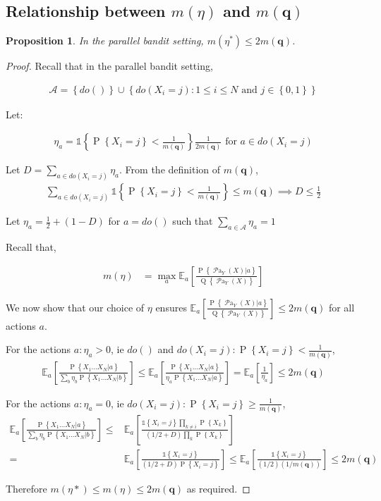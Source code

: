 \documentclass{article}
\newcommand{\set}[1]{\left\{#1\right\}}
\newcommand{\ind}[1]{\mathds{1}\!\!\set{#1}}
\newcommand{\eq}[1]{\begin{align*}#1\end{align*}}
\renewcommand{\P}[1]{\operatorname{P}\left\{#1\right\}}
\newcommand{\Q}[1]{\operatorname{Q}\left\{#1\right\}}
\newcommand{\EE}{\mathbb E}
\newcommand{\EEa}{\EE_a}
\newcommand{\Pn}[2]{\operatorname{P}\left\{#2|#1\right\}}
\newcommand{\parents}[1]{\operatorname{\mathcal{P}a}_{#1}}
\newcommand{\calA}{\mathcal A}
\theoremstyle{plain}
\newtheorem{proposition}[theorem]{Proposition}
\theoremstyle{definition}
\begin{document}
\subsection{Relationship between $m(\eta)$ and $m(\boldsymbol{q})$}\label{sec:m-equivelence}

\begin{proposition} In the parallel bandit setting,
$m(\eta^*) \leq 2m(\boldsymbol{q})$.
\end{proposition} 

\begin{proof}

Recall that in the parallel bandit setting,

\eq{
\mathcal{A} = \set{do()} \cup \set{ do(X_i = j) \colon 1 \leq i \leq N \text{ and } j \in \set{0,1}}
}

Let:

\eq {
\eta_a = \ind{\P{X_i = j} < \frac{1}{m(\boldsymbol{q})}}\frac{1}{2m(\boldsymbol{q})} \text { for } a \in do(X_i = j)
}

Let $D =\sum_{a\in do(X_i=j)}\eta_a$. From the definition of $m(\boldsymbol{q})$, 
\eq {
\sum_{a\in do(X_i=j)} \ind{\P{X_i = j} < \frac{1}{m(\boldsymbol{q})}} \leq m(\boldsymbol{q}) \implies D \leq \frac{1}{2}
}
 
Let $\eta_a = \frac{1}{2} + (1-D)$ for $a = do()$ such that $\sum_{a \in \calA}\eta_a = 1$ 

Recall that,

\eq{
m(\eta) &
= \max_a \EEa\left[\frac{\Pn{a}{\parents{Y}(X)}}{\Q{\parents{Y}(X)}}\right]
}

We now show that our choice of $\eta$ ensures $\EEa\left[\frac{\Pn{a}{\parents{Y}(X)}}{\Q{\parents{Y}(X)}}\right] \leq 2m(\boldsymbol{q})$ for all actions $a$.

For the actions $a: \eta_a > 0$, ie $do()$ and $do(X_i = j):\P{X_i=j}<\frac{1}{m(\boldsymbol{q})}$,
\eq{
\EEa\left[\frac{\Pn{a}{X_1...X_N}}{\sum_{b}\eta_b\Pn{b}{X_1...X_N}}\right] \leq \EEa\left[\frac{\Pn{a}{X_1...X_N}}{\eta_a\Pn{a}{X_1...X_N}}\right] = \EEa\left[\frac{1}{\eta_a}\right] \leq 2m(\boldsymbol{q})
}

For the actions $a :\eta_a = 0$, ie $do(X_i=j):\P{X_i=j}\geq\frac{1}{m(\boldsymbol{q})}$,
\eq{
\EEa\left[\frac{\Pn{a}{X_1...X_N}}{\sum_{b}\eta_b\Pn{b}{X_1...X_N}}\right] \leq & \EEa\left[\frac{\ind{X_i=j}\prod_{k\neq i}\P{X_k}}{(1/2+D)\prod_k \P{X_k}}\right] \\=& \EEa\left[\frac{\ind{X_i=j}}{(1/2+D)\P{X_i = j}}\right]
\leq  \EEa\left[\frac{\ind{X_i=j}}{(1/2)(1/m(\boldsymbol{q}))}\right] \leq 2m(\boldsymbol{q})
}

Therefore $m(\eta*) \leq m(\eta) \leq 2m(\boldsymbol{q})$ as required.

\end{proof}
\end{document}
